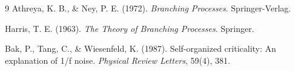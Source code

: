 \documentclass[11pt, a4paper]{article}
\theoremstyle{definition}
\begin{document}
\begin{thebibliography}{9}
Athreya, K. B., \& Ney, P. E. (1972). \textit{Branching Processes}. Springer-Verlag.

Harris, T. E. (1963). \textit{The Theory of Branching Processes}. Springer.

Bak, P., Tang, C., \& Wiesenfeld, K. (1987). Self-organized criticality: An explanation of 1/f noise. \textit{Physical Review Letters}, 59(4), 381.
\end{thebibliography}
\end{document}
